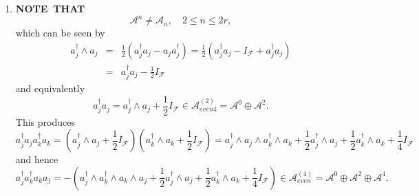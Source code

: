 \documentclass[aps,preprint]{revtex4}
\begin{document}
\begin{enumerate}
\begin{enumerate}
\begin{enumerate}
\item \textbf{NOTE\ THAT }%
\begin{equation}
\mathcal{A}^{n}\neq \mathcal{A}_{n},\quad 2\leq n\leq 2r,
\end{equation}%
which can be seen by 
\begin{eqnarray}
a_{j}^{\dagger }\wedge a_{j} &=&\frac{1}{2}\left( a_{j}^{\dagger
}a_{j}-a_{j}a_{j}^{\dagger }\right) =\frac{1}{2}\left( a_{j}^{\dagger
}a_{j}-I_{\mathcal{F}}+a_{j}^{\dagger }a_{j}\right) \\
&=&a_{j}^{\dagger }a_{j}-\frac{1}{2}I_{\mathcal{F}}
\end{eqnarray}%
and equivalently 
\begin{equation}
a_{j}^{\dagger }a_{j}=a_{j}^{\dagger }\wedge a_{j}+\frac{1}{2}I_{\mathcal{F}%
}\in \mathcal{A}_{even4}^{\left( 2\right) }=\mathcal{A}^{0}\oplus \mathcal{A}%
^{2}.
\end{equation}%
This produces 
\begin{equation}
a_{j}^{\dagger }a_{j}a_{k}^{\dagger }a_{k}=\left( a_{j}^{\dagger }\wedge
a_{j}+\frac{1}{2}I_{\mathcal{F}}\right) \left( a_{k}^{\dagger }\wedge a_{k}+%
\frac{1}{2}I_{\mathcal{F}}\right) =a_{j}^{\dagger }\wedge a_{j}\wedge
a_{k}^{\dagger }\wedge a_{k}+\frac{1}{2}a_{j}^{\dagger }\wedge a_{j}+\frac{1%
}{2}a_{k}^{\dagger }\wedge a_{k}+\frac{1}{4}I_{\mathcal{F}}
\end{equation}%
and hence 
\begin{equation}
a_{j}^{\dagger }a_{k}^{\dagger }a_{k}a_{j}=-\left( a_{j}^{\dagger }\wedge
a_{k}^{\dagger }\wedge a_{k}\wedge a_{j}+\frac{1}{2}a_{j}^{\dagger }\wedge
a_{j}+\frac{1}{2}a_{k}^{\dagger }\wedge a_{k}+\frac{1}{4}I_{\mathcal{F}%
}\right) \in \mathcal{A}_{even}^{\left( 4\right) }=\mathcal{A}^{0}\oplus 
\mathcal{A}^{2}\oplus \mathcal{A}^{4}.
\end{equation}


\end{enumerate}
\end{enumerate}
\end{enumerate}
\end{document}
